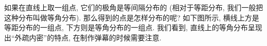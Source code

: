 如果在直线上取一组点, 它们的极角是等间隔分布的
(相对于等距分布, 我们一般把这种分布叫做等角分布).
那么得到的点是怎样分布的呢? 如下图所示,
横线上方是等距分布的一组点, 下方则是等角分布的一组点.
我们看到, 直线上的等角分布呈现出``外疏内密''的特点,
在制作弹幕的时候需要注意.

\begin{center}
\end{center}
